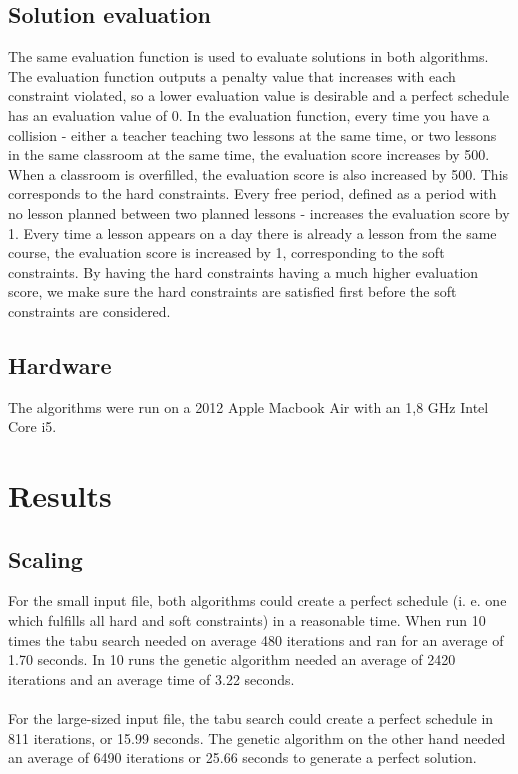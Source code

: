 \documentclass[titlepage,a4paper]{article}
\begin{document}
\subsection{Solution evaluation}
The same evaluation function is used to evaluate solutions in both algorithms. The evaluation function outputs a penalty value that increases with each constraint violated, so a lower evaluation value is desirable and a perfect schedule has an evaluation value of 0. In the evaluation function, every time you have a collision - either a teacher teaching two lessons at the same time, or two lessons in the same classroom at the same time, the evaluation score increases by 500. When a classroom is overfilled, the evaluation score is also increased by 500. This corresponds to the hard constraints. Every free period, defined as a period with no lesson planned between two planned lessons - increases the evaluation score by 1. Every time a lesson appears on a day there is already a lesson from the same course, the evaluation score is increased by 1, corresponding to the soft constraints. By having the hard constraints having a much higher evaluation score, we make sure the hard constraints are satisfied first before the soft constraints are considered.

\subsection{Hardware}
The algorithms were run on a 2012 Apple Macbook Air with an 1,8 GHz Intel Core i5.

\pagebreak
\section{Results}
\subsection{Scaling}
For the small input file, both algorithms could create a perfect schedule (i. e. one which fulfills all hard and soft constraints) in a reasonable time. When run 10 times the tabu search needed on average 480 iterations and ran for an average of 1.70 seconds. In 10 runs the genetic algorithm needed an average of 2420 iterations and an average time of 3.22 seconds. \\\\
For the large-sized input file, the tabu search could create a perfect schedule in 811 iterations, or 15.99 seconds. The genetic algorithm on the other hand needed an average of 6490 iterations or 25.66 seconds to generate a perfect solution.\\\\
\end{document}
